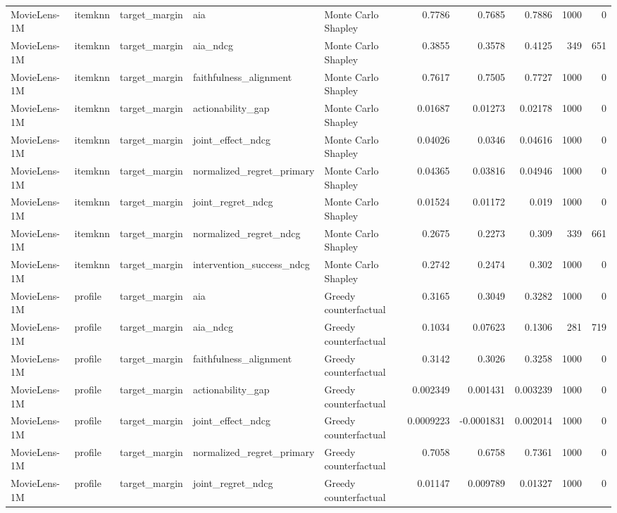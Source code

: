\begin{table}[t]
\begin{tabular}{lllllrrrrr}
MovieLens-1M & itemknn & target\_margin & aia & Monte Carlo Shapley & 0.7786 & 0.7685 & 0.7886 & 1000 & 0 \\
MovieLens-1M & itemknn & target\_margin & aia\_ndcg & Monte Carlo Shapley & 0.3855 & 0.3578 & 0.4125 & 349 & 651 \\
MovieLens-1M & itemknn & target\_margin & faithfulness\_alignment & Monte Carlo Shapley & 0.7617 & 0.7505 & 0.7727 & 1000 & 0 \\
MovieLens-1M & itemknn & target\_margin & actionability\_gap & Monte Carlo Shapley & 0.01687 & 0.01273 & 0.02178 & 1000 & 0 \\
MovieLens-1M & itemknn & target\_margin & joint\_effect\_ndcg & Monte Carlo Shapley & 0.04026 & 0.0346 & 0.04616 & 1000 & 0 \\
MovieLens-1M & itemknn & target\_margin & normalized\_regret\_primary & Monte Carlo Shapley & 0.04365 & 0.03816 & 0.04946 & 1000 & 0 \\
MovieLens-1M & itemknn & target\_margin & joint\_regret\_ndcg & Monte Carlo Shapley & 0.01524 & 0.01172 & 0.019 & 1000 & 0 \\
MovieLens-1M & itemknn & target\_margin & normalized\_regret\_ndcg & Monte Carlo Shapley & 0.2675 & 0.2273 & 0.309 & 339 & 661 \\
MovieLens-1M & itemknn & target\_margin & intervention\_success\_ndcg & Monte Carlo Shapley & 0.2742 & 0.2474 & 0.302 & 1000 & 0 \\
MovieLens-1M & profile & target\_margin & aia & Greedy counterfactual & 0.3165 & 0.3049 & 0.3282 & 1000 & 0 \\
MovieLens-1M & profile & target\_margin & aia\_ndcg & Greedy counterfactual & 0.1034 & 0.07623 & 0.1306 & 281 & 719 \\
MovieLens-1M & profile & target\_margin & faithfulness\_alignment & Greedy counterfactual & 0.3142 & 0.3026 & 0.3258 & 1000 & 0 \\
MovieLens-1M & profile & target\_margin & actionability\_gap & Greedy counterfactual & 0.002349 & 0.001431 & 0.003239 & 1000 & 0 \\
MovieLens-1M & profile & target\_margin & joint\_effect\_ndcg & Greedy counterfactual & 0.0009223 & -0.0001831 & 0.002014 & 1000 & 0 \\
MovieLens-1M & profile & target\_margin & normalized\_regret\_primary & Greedy counterfactual & 0.7058 & 0.6758 & 0.7361 & 1000 & 0 \\
MovieLens-1M & profile & target\_margin & joint\_regret\_ndcg & Greedy counterfactual & 0.01147 & 0.009789 & 0.01327 & 1000 & 0 \\

\end{tabular}
\end{table}
